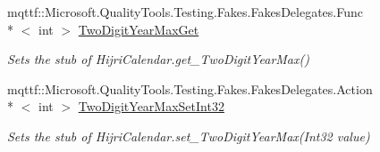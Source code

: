 \begin{DoxyCompactItemize}
mqttf\-::\-Microsoft.\-Quality\-Tools.\-Testing.\-Fakes.\-Fakes\-Delegates.\-Func\\*
$<$ int $>$ \hyperlink{class_system_1_1_globalization_1_1_fakes_1_1_stub_hijri_calendar_a526e88333349da31a4e90a63a661bc3c}{Two\-Digit\-Year\-Max\-Get}
\begin{DoxyCompactList}\small\item\em Sets the stub of Hijri\-Calendar.\-get\-\_\-\-Two\-Digit\-Year\-Max()\end{DoxyCompactList}\item 
mqttf\-::\-Microsoft.\-Quality\-Tools.\-Testing.\-Fakes.\-Fakes\-Delegates.\-Action\\*
$<$ int $>$ \hyperlink{class_system_1_1_globalization_1_1_fakes_1_1_stub_hijri_calendar_a744edba9e3f39489425fc0ec07fdf80f}{Two\-Digit\-Year\-Max\-Set\-Int32}
\begin{DoxyCompactList}\small\item\em Sets the stub of Hijri\-Calendar.\-set\-\_\-\-Two\-Digit\-Year\-Max(\-Int32 value)\end{DoxyCompactList}\end{DoxyCompactItemize}
